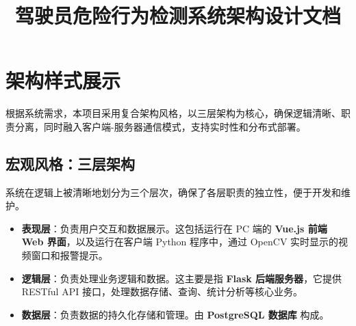 \documentclass[a4paper,12pt]{article}
\title{驾驶员危险行为检测系统架构设计文档}
\author{}
\date{}
\begin{document}
\maketitle
\tableofcontents
\newpage

\section{架构样式展示}
根据系统需求，本项目采用复合架构风格，以三层架构为核心，确保逻辑清晰、职责分离，同时融入客户端-服务器通信模式，支持实时性和分布式部署。

\subsection{宏观风格：三层架构}
系统在逻辑上被清晰地划分为三个层次，确保了各层职责的独立性，便于开发和维护。
\begin{itemize}
  \item \textbf{表现层}：负责用户交互和数据展示。这包括运行在 PC 端的 \textbf{Vue.js 前端 Web 界面}，以及运行在客户端 Python 程序中，通过 OpenCV 实时显示的视频窗口和报警提示。
  \item \textbf{逻辑层}：负责处理业务逻辑和数据。这主要是指 \textbf{Flask 后端服务器}，它提供 RESTful API 接口，处理数据存储、查询、统计分析等核心业务。
  \item \textbf{数据层}：负责数据的持久化存储和管理。由 \textbf{PostgreSQL 数据库} 构成。
\end{itemize}
\end{document}
